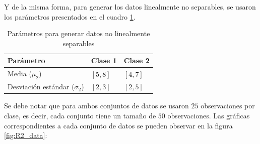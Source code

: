 \documentclass{article}
\begin{document}
\noindent
Y de la misma forma, para generar los datos linealmente no separables, se usaron los parámetros presentados en el cuadro \ref{tab:nonlinear_params}.
\begin{table}[h!]
    \centering
    \begin{tabular}{@{}lll@{}}
    \toprule
    Parámetro & Clase 1 & Clase 2 \\ \midrule
    Media ($\mu_2$) & $[5, 8]$ & $[4, 7]$ \\
    Desviación estándar ($\sigma_2$) & $[2, 3]$ & $[2, 5]$ \\ \bottomrule
    \end{tabular}
    \caption{Parámetros para generar datos no linealmente separables}
    \label{tab:nonlinear_params}
\end{table}
\noindent
Se debe notar que para ambos conjuntos de datos se usaron $25$ observaciones por clase, es decir, cada conjunto tiene un tamaño de $50$ observaciones. Las gráficas correspondientes a cada conjunto de datos se pueden observar en la figura \ref{fig:R2_data}:
\end{document}

